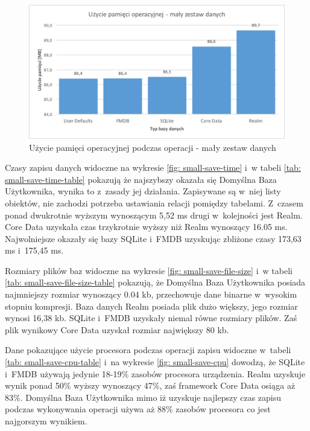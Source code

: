 \begin{figure}[h]
\centering
	\includegraphics[width=15cm]{img/save_data/save_ram_small.png}
	\caption{Użycie pamięci operacyjnej podczas operacji - mały zestaw danych}
	\label{fig: small-save-ram}
\end{figure}

\newpage

Czasy zapisu danych widoczne na wykresie \ref{fig: small-save-time} i~w tabeli \ref{tab: small-save-time-table} pokazują że najszybszy okazała się Domyślna Baza Użytkownika, wynika to z~zasady jej działania. Zapisywane są w~niej listy obiektów, nie zachodzi potrzeba ustawiania relacji pomiędzy tabelami. Z~czasem ponad dwukrotnie wyższym wynoszącym 5,52 ms drugi w~kolejności jest Realm. Core Data uzyskała czas trzykrotnie wyższy niż Realm wynoszący 16.05 ms. Najwolniejsze okazały się bazy SQLite i~FMDB uzyskując zbliżone czasy 173,63 ms i~175,45 ms. \par 

Rozmiary plików baz widoczne na wykresie \ref{fig: small-save-file-size} i~w tabeli \ref{tab: small-save-file-size-table} pokazują, że Domyślna Baza Użytkownika posiada najmniejszy rozmiar wynoszący 0.04 kb, przechowuje dane binarne w~wysokim stopniu kompresji. Baza danych Realm posiada plik dużo większy, jego rozmiar wynosi 16,38 kb. SQLite i~FMDB uzyskały niemal równe rozmiary plików. Zaś plik wynikowy Core Data uzyskał rozmiar największy 80 kb. \par

Dane pokazujące użycie procesora podczas operacji zapisu widoczne w~tabeli \ref{tab: small-save-cpu-table} i~na wykresie \ref{fig: small-save-cpu} dowodzą, że SQLite i~FMDB używają jedynie 18-19\% zasobów procesora urządzenia. Realm uzyskuje wynik ponad 50\% wyższy wynoszący 47\%, zaś framework Core Data osiąga aż 83\%. Domyślna Baza Użytkownika mimo iż uzyskuje najlepszy czas zapisu podczas wykonywania operacji używa aż 88\% zasobów procesora co jest najgorszym wynikiem.\par 

